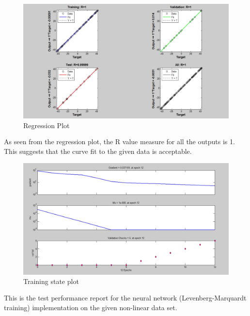 \documentclass[12pt]{article}
\begin{document}
\begin{figure}[H]
\begin{center}
\includegraphics[scale=0.4]{nn3.jpg}
\caption{Regression Plot}  
\end{center}
\end{figure}
As seen from the regression plot, the R value measure for all the outputs is 1. This suggests that the curve fit to the given data is acceptable.
\begin{figure}[H]
\begin{center}
\includegraphics[scale=0.4]{nn4.jpg}
\caption{Training state plot}  
\end{center}
\end{figure}
This is the test performance report for the neural network (Levenberg-Marquardt training) implementation on the given non-linear data set.
\end{document}
